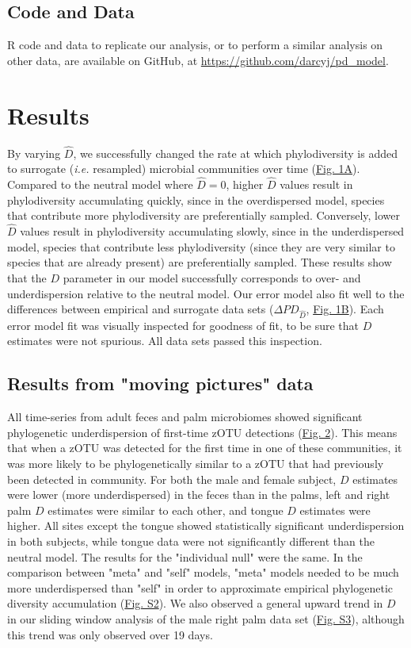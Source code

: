 \documentclass{article}
\begin{document}
\subsection{Code and Data} \label{sec:codeAndData}
R code and data to replicate our analysis, or to perform a similar analysis on other data, are available on GitHub, at \url{https://github.com/darcyj/pd_model}. 


\section{Results} \label{sec:results}
By varying \(\hat{D}\), we successfully changed the rate at which phylodiversity is added to surrogate (\emph{i.e.} resampled) microbial communities over time (\hyperref[sec:figure1]{Fig. 1A}). Compared to the neutral model where \(\hat{D} = 0\), higher \(\hat{D}\) values result in phylodiversity accumulating quickly, since in the overdispersed model, species that contribute more phylodiversity are preferentially sampled. Conversely, lower \(\hat{D}\) values result in phylodiversity accumulating slowly, since in the underdispersed model, species that contribute less phylodiversity (since they are very similar to species that are already present) are preferentially sampled. These results show that the \(D\) parameter in our model successfully corresponds to over- and underdispersion relative to the neutral model. Our error model also fit well to the differences between empirical and surrogate data sets (\(\Delta PD_{\hat{D}}\), \hyperref[sec:figure1]{Fig. 1B}). Each error model fit was visually inspected for goodness of fit, to be sure that \(D\) estimates were not spurious. All data sets passed this inspection.

\subsection{Results from "moving pictures" data}
All time-series from adult feces and palm microbiomes \cite{Caporaso2011} showed significant phylogenetic underdispersion of first-time zOTU detections (\hyperref[sec:figure2]{Fig. 2}). This means that when a zOTU was detected for the first time in one of these communities, it was more likely to be phylogenetically similar to a zOTU that had previously been detected in community. For both the male and female subject, \(D\) estimates were lower (more underdispersed) in the feces than in the palms, left and right palm \(D\) estimates were similar to each other, and tongue \(D\) estimates were higher. All sites except the tongue showed statistically significant underdispersion in both subjects, while tongue data were not significantly different than the neutral model. The results for the "individual null" were the same. In the comparison between "meta" and "self" models, "meta" models needed to be much more underdispersed than "self" in order to approximate empirical phylogenetic diversity accumulation (\hyperref[sec:figureS2]{Fig. S2}). We also observed a general upward trend in \(D\) in our sliding window analysis of the male right palm data set (\hyperref[sec:figureS3]{Fig. S3}), although this trend was only observed over 19 days.
\end{document}
